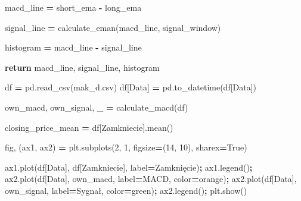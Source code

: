 \documentclass[
]{article}
\newenvironment{Shaded}{\begin{snugshade}}{\end{snugshade}}
\newcommand{\ControlFlowTok}[1]{\textcolor[rgb]{0.13,0.29,0.53}{\textbf{#1}}}
\newcommand{\DecValTok}[1]{\textcolor[rgb]{0.00,0.00,0.81}{#1}}
\newcommand{\NormalTok}[1]{#1}
\newcommand{\OperatorTok}[1]{\textcolor[rgb]{0.81,0.36,0.00}{\textbf{#1}}}
\newcommand{\StringTok}[1]{\textcolor[rgb]{0.31,0.60,0.02}{#1}}
\newcommand{\VariableTok}[1]{\textcolor[rgb]{0.00,0.00,0.00}{#1}}
\begin{document}
\begin{Shaded}
\begin{Highlighting}[]
\NormalTok{    macd\_line }\OperatorTok{=}\NormalTok{ short\_ema }\OperatorTok{{-}}\NormalTok{ long\_ema}

\NormalTok{    signal\_line }\OperatorTok{=}\NormalTok{ calculate\_eman(macd\_line, signal\_window)}

\NormalTok{    histogram }\OperatorTok{=}\NormalTok{ macd\_line }\OperatorTok{{-}}\NormalTok{ signal\_line}

    \ControlFlowTok{return}\NormalTok{ macd\_line, signal\_line, histogram}

\NormalTok{df }\OperatorTok{=}\NormalTok{ pd.read\_csv(}\StringTok{\textquotesingle{}mak\_d.csv\textquotesingle{}}\NormalTok{)}
\NormalTok{df[}\StringTok{\textquotesingle{}Data\textquotesingle{}}\NormalTok{] }\OperatorTok{=}\NormalTok{ pd.to\_datetime(df[}\StringTok{\textquotesingle{}Data\textquotesingle{}}\NormalTok{])}

\NormalTok{own\_macd, own\_signal, \_ }\OperatorTok{=}\NormalTok{ calculate\_macd(df)}

\NormalTok{closing\_price\_mean }\OperatorTok{=}\NormalTok{ df[}\StringTok{\textquotesingle{}Zamkniecie\textquotesingle{}}\NormalTok{].mean()}

\NormalTok{fig, (ax1, ax2) }\OperatorTok{=}\NormalTok{ plt.subplots(}\DecValTok{2}\NormalTok{, }\DecValTok{1}\NormalTok{, figsize}\OperatorTok{=}\NormalTok{(}\DecValTok{14}\NormalTok{, }\DecValTok{10}\NormalTok{), sharex}\OperatorTok{=}\VariableTok{True}\NormalTok{)}

\NormalTok{ax1.plot(df[}\StringTok{\textquotesingle{}Data\textquotesingle{}}\NormalTok{], df[}\StringTok{\textquotesingle{}Zamkniecie\textquotesingle{}}\NormalTok{], label}\OperatorTok{=}\StringTok{\textquotesingle{}Zamknięcie\textquotesingle{}}\NormalTok{)}\OperatorTok{;}
\NormalTok{ax1.legend()}\OperatorTok{;}
\NormalTok{ax2.plot(df[}\StringTok{\textquotesingle{}Data\textquotesingle{}}\NormalTok{], own\_macd, label}\OperatorTok{=}\StringTok{\textquotesingle{}MACD\textquotesingle{}}\NormalTok{, color}\OperatorTok{=}\StringTok{\textquotesingle{}orange\textquotesingle{}}\NormalTok{)}\OperatorTok{;}
\NormalTok{ax2.plot(df[}\StringTok{\textquotesingle{}Data\textquotesingle{}}\NormalTok{], own\_signal, label}\OperatorTok{=}\StringTok{\textquotesingle{}Sygnał\textquotesingle{}}\NormalTok{, color}\OperatorTok{=}\StringTok{\textquotesingle{}green\textquotesingle{}}\NormalTok{)}\OperatorTok{;}
\NormalTok{ax2.legend()}\OperatorTok{;}
\NormalTok{plt.show()}
\end{Highlighting}
\end{Shaded}
\end{document}
